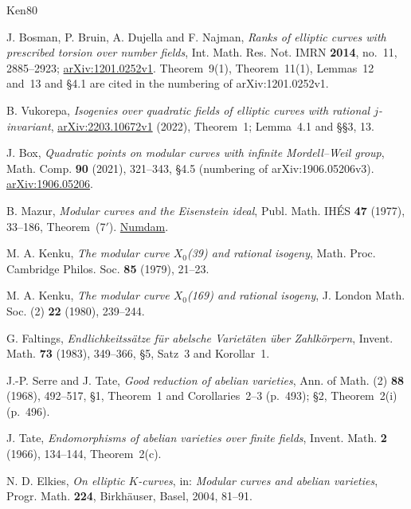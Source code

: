 \documentclass[11pt]{article}
\begin{document}
\begin{thebibliography}{Ken80}

J. Bosman, P. Bruin, A. Dujella and F. Najman,
\emph{Ranks of elliptic curves with prescribed torsion over number fields},
Int. Math. Res. Not. IMRN \textbf{2014}, no.~11, 2885--2923;
     \href{https://arxiv.org/abs/1201.0252}{arXiv:1201.0252v1}. Theorem~9(1), Theorem~11(1),
     Lemmas~12 and~13 and \S4.1 are cited in the numbering of arXiv:1201.0252v1.

B. Vukorepa,
\emph{Isogenies over quadratic fields of elliptic curves with rational \(j\)-invariant},
\href{https://arxiv.org/abs/2203.10672}{arXiv:2203.10672v1} (2022), Theorem~1; Lemma~4.1 and
     \S\S3, 13.

J. Box,
\emph{Quadratic points on modular curves with infinite Mordell--Weil group},
Math. Comp. \textbf{90} (2021), 321--343, \S4.5 (numbering of arXiv:1906.05206v3).
     \href{https://arxiv.org/abs/1906.05206}{arXiv:1906.05206}.

B. Mazur,
\emph{Modular curves and the Eisenstein ideal},
Publ. Math. IH\'ES \textbf{47} (1977), 33--186, Theorem~(7$'$).
     \href{https://www.numdam.org/item/PMIHES_1977__47__33_0/}{Numdam}.

M. A. Kenku,
\emph{The modular curve \(X_0\)(39) and rational isogeny},
Math. Proc. Cambridge Philos. Soc. \textbf{85} (1979), 21--23.

M. A. Kenku,
\emph{The modular curve \(X_0\)(169) and rational isogeny},
J. London Math. Soc. (2) \textbf{22} (1980), 239--244.

G. Faltings,
\emph{Endlichkeitss\"atze f\"ur abelsche Variet\"aten \"uber Zahlkörpern},
Invent. Math. \textbf{73} (1983), 349--366, \S5, Satz~3 and Korollar~1.

J.-P. Serre and J. Tate,
\emph{Good reduction of abelian varieties},
Ann. of Math. (2) \textbf{88} (1968), 492--517, \S1, Theorem~1 and Corollaries~2--3 (p.~493); \S2, Theorem~2(i) (p.~496).

J. Tate,
\emph{Endomorphisms of abelian varieties over finite fields},
Invent. Math. \textbf{2} (1966), 134--144, Theorem~2(c).

N. D. Elkies,
\emph{On elliptic \(K\)-curves},
in: \emph{Modular curves and abelian varieties}, Progr. Math. \textbf{224}, Birkh\"auser, Basel, 2004,
     81--91.

\end{thebibliography}
\end{document}
